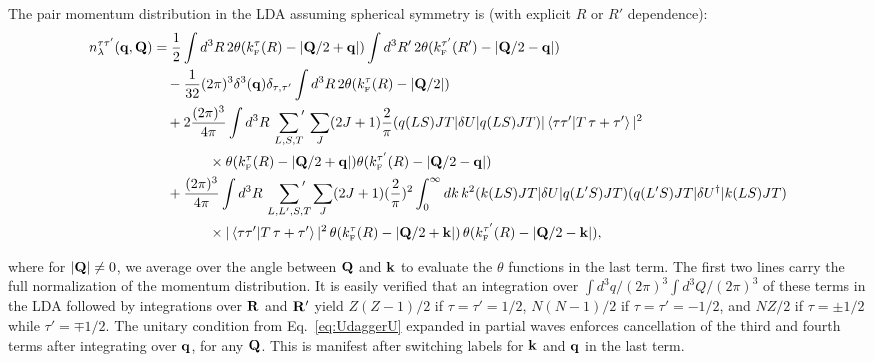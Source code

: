 \documentclass[10pt,aps,prc,floatfix,twocolumn,nofootinbib]{revtex4-1}
\begin{document}
\begin{widetext}
%
The pair momentum distribution in the LDA assuming spherical symmetry is (with explicit $R$ or $R'$ dependence):
%
\begin{align}
    \label{eq:pmd_partial_waves}
    n_{\lambda}^{\tau \tau'}(\qvec,\mathbf{Q}) &= \frac{1}{2} 
    \int d^3R\, 2 \theta(\kF^{\tau}(R)-\abs{\mathbf{Q}/2 + \mathbf{q}}) 
    \int d^3R'\, 2\theta(\kF^{\tau'}(R') -\abs{\mathbf{Q}/2 - \mathbf{q}}) 
    \notag \\
    & \quad \null - \frac{1}{32}(2\pi)^3\delta^3(\qvec) \delta_{\tau,\tau'}
    \int d^3R\, 2 \theta(\kF^{\tau}(R)-\abs{\mathbf{Q}/2}) 
    \notag \\
    & \quad\null + 2\frac{(2\pi)^3}{4\pi} \int d^3R\,\sum_{L,S,T}\!\!{\vphantom{\sum}}'\, \sum_{J}  (2J+1) \frac{2}{\pi}  
    \melr{q (L S) J T}{\delta U}{q (L S) J T}
    |\braket{\tau \tau'}{T\, \tau+\tau'}|^2
    \notag \\
    & \qquad\qquad \null \times
    \theta(\kF^{\tau}(R)-\abs{\mathbf{Q}/2 + \mathbf{q}}) \theta(\kF^{\tau'}(R)-\abs{\mathbf{Q}/2 - \mathbf{q}})  \notag \\
    & \quad \null +  \frac{(2\pi)^3}{4\pi} \int d^3R\, \sum_{L,L',S,T}\!\!\!\!\!{\vphantom{\sum}}'\,\,  \sum_{J} (2J+1) (\frac{2}{\pi})^2 \int_0^{\infty} dk\, k^2  
    \melr{k (L S) J T}{\delta U}{q (L' S) J T} \melr{q (L' S) J T}{\delta U^{\dagger}}{k (L S) J T}   \notag \\  
     & \qquad\qquad \null\times 
    |\braket{\tau \tau'}{T \,\tau+\tau'}|^2
     \,\theta(\kF^{\tau}(R)-\abs{\mathbf{Q}/2 + \mathbf{k}}) \,\theta(\kF^{\tau'}(R)-\abs{\mathbf{Q}/2 - \mathbf{k}}),
\end{align}
%
\end{widetext}
%
where for $|\mathbf{Q}| \neq 0$, we average over the angle between $\mathbf{Q}$ and $\mathbf{k}$ to evaluate the $\theta$ functions in the last term.
The first two lines carry the full normalization of the momentum distribution. 
It is easily verified that an integration over $\int d^3q/(2\pi)^3 \int d^3Q/(2\pi)^3$ of these terms in the LDA followed by integrations over $\mathbf{R}$ and $\mathbf{R}'$  yield $Z(Z-1)/2$ if $\tau=\tau' = 1/2$, $N(N-1)/2$ if $\tau=\tau'=-1/2$, and $NZ/2$ if $\tau=\pm 1/2$ while $\tau'=\mp 1/2$.
The unitary condition from Eq.~\eqref{eq:UdaggerU} expanded in partial waves enforces cancellation of the third and fourth terms after integrating over $\mathbf{q}$, for any $\mathbf{Q}$. 
This is manifest after switching labels for $\mathbf{k}$ and $\mathbf{q}$ in the last term.
\end{document}
